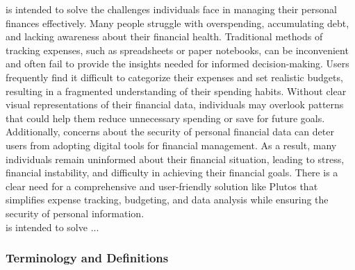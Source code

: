 \documentclass[12pt]{article}
\begin{document}
\progname{} is intended to solve the challenges individuals face in managing their personal finances effectively. Many people struggle with overspending, accumulating debt, and lacking awareness about their financial health. Traditional methods of tracking expenses, such as spreadsheets or paper notebooks, can be inconvenient and often fail to provide the insights needed for informed decision-making.
Users frequently find it difficult to categorize their expenses and set realistic budgets, resulting in a fragmented understanding of their spending habits. Without clear visual representations of their financial data, individuals may overlook patterns that could help them reduce unnecessary spending or save for future goals. Additionally, concerns about the security of personal financial data can deter users from adopting digital tools for financial management.
As a result, many individuals remain uninformed about their financial situation, leading to stress, financial instability, and difficulty in achieving their financial goals. There is a clear need for a comprehensive and user-friendly solution like Plutos that simplifies expense tracking, budgeting, and data analysis while ensuring the security of personal information.
\\

\progname{} is intended to solve ... 

\subsubsection{Terminology and  Definitions}
\end{document}
